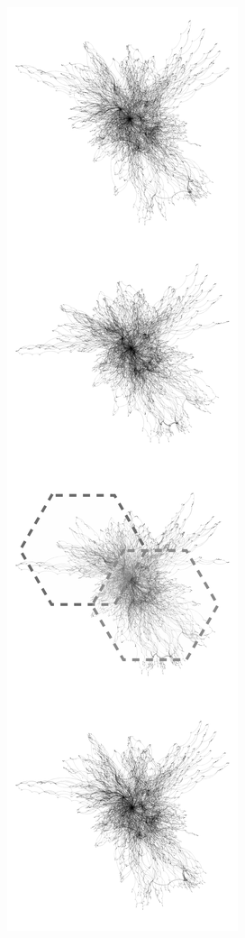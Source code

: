 \begin{figure}[H]
     \centering
     \begin{subfigure}[b]{.2\textwidth}
         \centering
     \includegraphics[width=\textwidth]{figures_c1/beijingtest/1.png}

\end{subfigure}
\end{figure}
